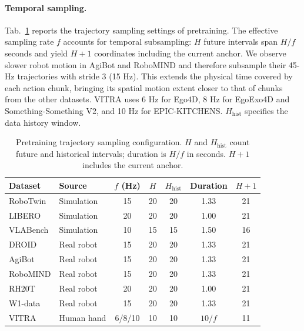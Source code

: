 \paragraph{Temporal sampling.}
Tab.~\ref{tab:app:temporal} reports the trajectory sampling settings of
pretraining. The effective sampling rate $f$ accounts for temporal
subsampling: $H$ future intervals span $H/f$ seconds and yield $H+1$
coordinates including the current anchor. We observe slower robot motion
in AgiBot and RoboMIND and therefore
subsample their 45-Hz trajectories with stride 3 (15 Hz). This extends
the physical time covered by each action chunk, bringing its spatial
motion extent closer to that of chunks from the other datasets.
VITRA uses 6 Hz for Ego4D, 8 Hz for EgoExo4D and Something-Something V2,
and 10 Hz for EPIC-KITCHENS. $H_{\mathrm{hist}}$ specifies the data history
window.

\begin{table}[!htbp]
    \centering
    \small
    \setlength{\tabcolsep}{5pt}
    \renewcommand{\arraystretch}{1.12}
    \caption{Pretraining trajectory sampling configuration. $H$ and
    $H_{\mathrm{hist}}$ count future and historical intervals; duration is
    $H/f$ in seconds. $H+1$ includes the current anchor.}
    \label{tab:app:temporal}
    \vspace{3pt}
    \begin{tabular}{@{}llccccc@{}}
        \toprule
        Dataset & Source & $f$ (Hz) & $H$ & $H_{\mathrm{hist}}$ & Duration & $H+1$ \\
        \midrule
        RoboTwin & Simulation & 15 & 20 & 20 & 1.33 & 21 \\
        LIBERO & Simulation & 20 & 20 & 20 & 1.00 & 21 \\
        VLABench & Simulation & 10 & 15 & 15 & 1.50 & 16 \\
        DROID & Real robot & 15 & 20 & 20 & 1.33 & 21 \\
        AgiBot & Real robot & 15 & 20 & 20 & 1.33 & 21 \\
        RoboMIND & Real robot & 15 & 20 & 20 & 1.33 & 21 \\
        RH20T & Real robot & 20 & 20 & 20 & 1.00 & 21 \\
        W1-data & Real robot & 15 & 20 & 20 & 1.33 & 21 \\
        VITRA & Human hand & 6/8/10 & 10 & 10 & $10/f$ & 11 \\
        \bottomrule
    \end{tabular}
\end{table}

